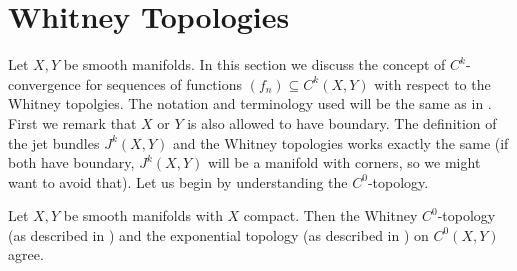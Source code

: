 \section{Whitney Topologies}

Let $X,Y$ be smooth manifolds. In this section we discuss the concept of $C^k$-convergence for sequences of functions $(f_n) \subseteq C^k(X,Y)$ with respect to the Whitney topolgies. The notation and terminology used will be the same as in \cite{golubitsky2012stable}. First we remark that $X$ or $Y$ is also allowed to have boundary. The definition of the jet bundles $J^k(X,Y)$ and the Whitney topologies works exactly the same (if both have boundary, $J^k(X,Y)$ will be a manifold with corners, so we might want to avoid that). Let us begin by understanding the $C^0$-topology.

\begin{lemma}
    \label{whitney_top:lem:c0_and_exponential_topology_agree}
    Let $X,Y$ be smooth manifolds with $X$ compact. Then the Whitney $C^0$-topology (as described in \cite{golubitsky2012stable}) and the exponential topology (as described in \cite{steimle_topo}) on $C^0(X,Y)$ agree.
\end{lemma}

